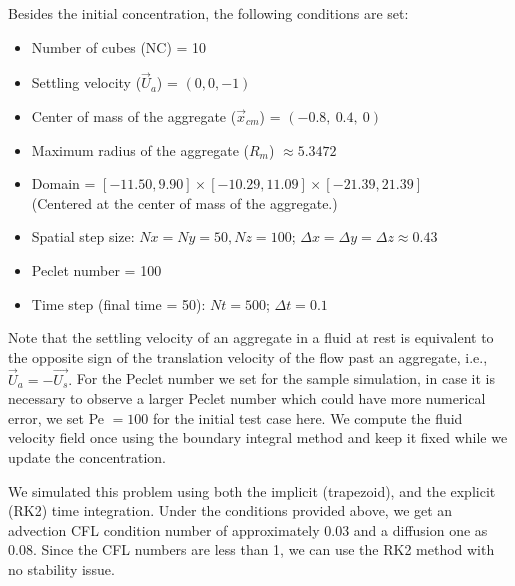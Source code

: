 Besides the initial concentration, the following conditions are set:
\begin{framed}
\begin{itemize}
	\item Number of cubes (NC) = 10
	\item Settling velocity ($\vec{U}_a$) = $(0,0,-1)$
	\item Center of mass of the aggregate ($\vec{x}_{cm}$) = $(-0.8, \  0.4, \ 0)$
	\item Maximum radius of the aggregate ($R_m$) $\approx 5.3472$
	\item Domain = $[-11.50, 9.90] \times [-10.29, 11.09] \times [-21.39, 21.39]$\\
	(Centered at the center of mass of the aggregate.)
	\item Spatial step size: $Nx = Ny = 50, Nz = 100$; $\Delta x = \Delta y = \Delta z \approx 0.43$
	\item Peclet number = 100
	\item Time step (final time = 50): $Nt = 500$; $\Delta t = 0.1$
\end{itemize}
\end{framed}
Note that the settling velocity of an aggregate in a fluid at rest is equivalent to the opposite sign of the translation velocity of the flow past an aggregate, i.e.,  $\vec{U}_a = -\vec{U_s}.$
For the Peclet number we set for the sample simulation, in case it is necessary to observe a larger Peclet number which could have more numerical error, we set Pe $=100$ for the initial test case here.
We compute the fluid velocity field once using the boundary integral method and keep it fixed while we update the concentration. 
\par
We simulated this problem using both the implicit (trapezoid), and the explicit (RK2) time integration. Under the conditions provided above, we get an advection CFL condition number of approximately 0.03 and a diffusion one as 0.08. Since the CFL numbers are less than 1, we can use the RK2 method with no stability issue. 
